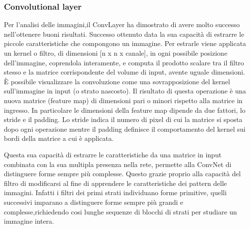 \documentclass[14pt]{extarticle}
\begin{document}
\subsubsection{Convolutional layer}
Per l'analisi delle immagini,il ConvLayer ha dimostrato di avere molto successo
nell'ottenere buoni risultati. Successo ottenuto data la sua capacità di  estrarre le piccole caratteristiche che compongono un immagine. 
Per estrarle viene applicata  un kernel o filtro, di dimensioni
[n x n x canale], in ogni possibile posizione dell'immagine, coprendola interamente, e computa il prodotto scalare tra il filtro stesso e la matrice corrispondente del volume di input, avente
uguale dimensioni. È possibile visualizzare la convoluzione come una sovrapposizione del kernel sull’immagine in input (o strato nascosto). \cite{aggarwal2018neural} 
Il risultato di questa operazione è una nuova matrice (feature map) di dimensioni pari o minori rispetto alla matrice in ingresso. In particolare le dimensioni della feature map dipende da due fattori, lo stride e il padding.
Lo stride indica il numero di pixel di cui la matrice si sposta dopo ogni operazione
mentre il padding definisce il comportamento del kernel sui bordi della matrice a cui è applicata.\cite{mattsson2016classification}

Questa sua capacità di estrarre le caratteristiche da una matrice in input combinata con la sua multipla presenza nella rete, permette alla ConvNet di distinguere forme sempre più complesse. Questo grazie proprio alla capacità del filtro di modificarsi al fine di apprendere le caratteristiche dei pattern delle immagini. Infatti i  filtri dei primi strati individuano forme primitive, quelli successivi imparano a distinguere forme sempre più grandi e complesse,richiedendo cosi lunghe sequenze di blocchi di strati per studiare un immagine intera.\cite{torresin2019sviluppo}
\end{document}
